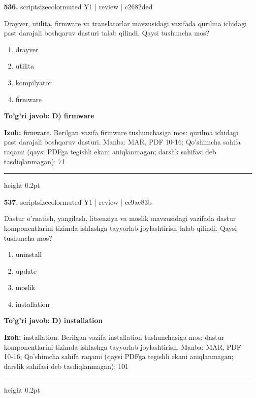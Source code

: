 \documentclass[10pt,a4paper]{article}
\begin{document}
{\bfseries\sffamily\color{ink} 536.} {scriptsizecolor{muted} Y1 | review | c2682ded}
\par
Drayver, utilita, firmware va translatorlar mavzusidagi vazifada qurilma ichidagi past darajali boshqaruv dasturi talab qilindi. Qaysi tushuncha mos?
\begin{enumerate}[label=\Alph*),leftmargin=9mm]
\item drayver
\item utilita
\item kompilyator
\item firmware
\end{enumerate}
\begin{tcolorbox}[enhanced,breakable,colback=teal!4,colframe=teal!60!black,boxrule=0.45pt,arc=1.2mm,left=2.7mm,right=2.7mm,top=1.8mm,bottom=1.8mm,before skip=2mm,after skip=2mm]
{\bfseries\sffamily\color{teal}To'g'ri javob:} \textbf{D) firmware}
\par\smallskip
{\bfseries Izoh:} firmware. Berilgan vazifa firmware tushunchasiga mos: qurilma ichidagi past darajali boshqaruv dasturi. Manba: MAR, PDF 10-16; Qo'shimcha sahifa raqami (qaysi PDFga tegishli ekani aniqlanmagan; darslik sahifasi deb tasdiqlanmagan): 71
\end{tcolorbox}
\vspace{2mm}\hrule height 0.2pt\vspace{3mm}

{\bfseries\sffamily\color{ink} 537.} {scriptsizecolor{muted} Y1 | review | cc9ae83b}
\par
Dastur o'rnatish, yangilash, litsenziya va moslik mavzusidagi vazifada dastur komponentlarini tizimda ishlashga tayyorlab joylashtirish talab qilindi. Qaysi tushuncha mos?
\begin{enumerate}[label=\Alph*),leftmargin=9mm]
\item uninstall
\item update
\item moslik
\item installation
\end{enumerate}
\begin{tcolorbox}[enhanced,breakable,colback=teal!4,colframe=teal!60!black,boxrule=0.45pt,arc=1.2mm,left=2.7mm,right=2.7mm,top=1.8mm,bottom=1.8mm,before skip=2mm,after skip=2mm]
{\bfseries\sffamily\color{teal}To'g'ri javob:} \textbf{D) installation}
\par\smallskip
{\bfseries Izoh:} installation. Berilgan vazifa installation tushunchasiga mos: dastur komponentlarini tizimda ishlashga tayyorlab joylashtirish. Manba: MAR, PDF 10-16; Qo'shimcha sahifa raqami (qaysi PDFga tegishli ekani aniqlanmagan; darslik sahifasi deb tasdiqlanmagan): 101
\end{tcolorbox}
\vspace{2mm}\hrule height 0.2pt\vspace{3mm}
\end{document}
